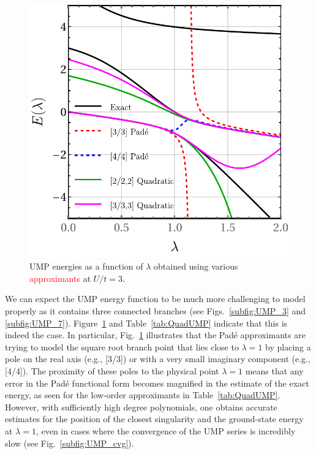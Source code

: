 \documentclass[aps,prb,reprint,noshowkeys,superscriptaddress]{revtex4-1}
\newcommand{\titou}[1]{\textcolor{red}{#1}}
\newcommand{\latin}[1]{#1}
\newcommand{\eg}{\latin{e.g.}}
\begin{document}
\begin{figure}[t]
    \includegraphics[width=\linewidth]{fig10}
    \caption{\label{fig:QuadUMP}
    UMP energies as a function of $\lambda$ obtained using various \titou{approximants} at $U/t = 3$.}
\end{figure}

We can expect the UMP energy function to be much more challenging 
to model properly as it contains three connected branches 
(see Figs.~\ref{subfig:UMP_3} and \ref{subfig:UMP_7}).
Figure~\ref{fig:QuadUMP} and Table~\ref{tab:QuadUMP} indicate that this is indeed the case. 
In particular, Fig.~\ref{fig:QuadUMP} illustrates that the Pad\'e approximants are trying to model
the square root branch point that lies close to $\lambda = 1$ by placing a pole on the real axis
(\eg, [3/3]) or with a very small imaginary component (\eg, [4/4]).
The proximity of these poles to the physical point $\lambda = 1$ means that any error in the Pad\'e 
functional form becomes magnified in the estimate of the exact energy, as seen for the low-order
approximants in Table~\ref{tab:QuadUMP}.
However, with sufficiently high degree polynomials, one obtains
accurate estimates for the position of the closest singularity and the ground-state energy at $\lambda = 1$,
even in cases where the convergence of the UMP series is incredibly slow 
(see Fig.~\ref{subfig:UMP_cvg}).
\end{document}
